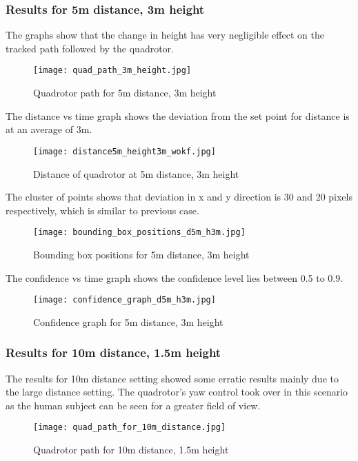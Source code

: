 \newpage
\subsubsection{Results for 5m distance, 3m height}
The graphs show that the change in height has very negligible effect on the tracked path followed by the quadrotor.

\begin{figure}[!htb]
	\centering
	\texttt{[image: quad\_path\_3m\_height.jpg]}
	\caption{Quadrotor path for 5m distance, 3m height\label{Quadrotor path for 5m distance, 3m height}}
\end{figure}

The distance vs time graph shows the deviation from the set point for distance is at an average of 3m.
\begin{figure}[!htb]
	\centering
	\texttt{[image: distance5m\_height3m\_wokf.jpg]}
	\caption{Distance of quadrotor at 5m distance, 3m height\label{Distance of quadrotor at 5m distance, 3m height}}
\end{figure}

The cluster of points shows that deviation in x and y direction is 30 and 20 pixels respectively, which is similar to previous case.
\begin{figure}[!htb]
	\centering
	\texttt{[image: bounding\_box\_positions\_d5m\_h3m.jpg]}
	\caption{Bounding box positions for 5m distance, 3m height\label{Bounding box positions for 5m distance, 3m height}}
\end{figure}

The confidence vs time graph shows the confidence level lies between 0.5 to 0.9.
\begin{figure}[!htb]
	\centering
	\texttt{[image: confidence\_graph\_d5m\_h3m.jpg]}
	\caption{Confidence graph for 5m distance, 3m height\label{Confidence graph for 5m distance, 3m height}}
\end{figure}

\newpage
\subsubsection{Results for 10m distance, 1.5m height}
The results for 10m distance setting showed some erratic results mainly due to the large distance setting. The quadrotor's yaw control took over in this scenario as the human subject can be seen for a greater field of view.

\begin{figure}[!htb]
	\centering
	\texttt{[image: quad\_path\_for\_10m\_distance.jpg]}
	\caption{Quadrotor path for 10m distance, 1.5m height\label{Quadrotor path for 10m distance, 1.5m height}}
\end{figure}

